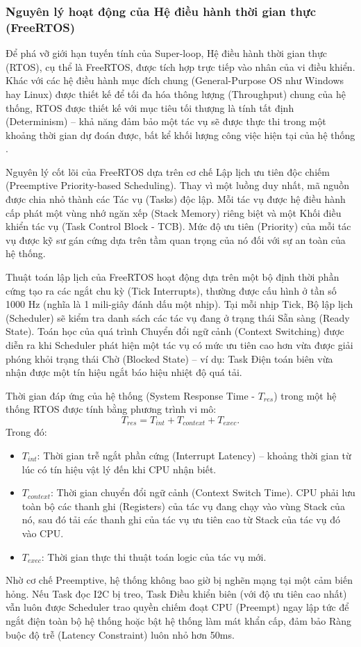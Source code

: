 \subsubsection{Nguyên lý hoạt động của Hệ điều hành thời gian thực (FreeRTOS)}
Để phá vỡ giới hạn tuyến tính của Super-loop, Hệ điều hành thời gian thực (RTOS), cụ thể là FreeRTOS, được tích hợp trực tiếp vào nhân của vi điều khiển. Khác với các hệ điều hành mục đích chung (General-Purpose OS như Windows hay Linux) được thiết kế để tối đa hóa thông lượng (Throughput) chung của hệ thống, RTOS được thiết kế với mục tiêu tối thượng là tính tất định (Determinism) – khả năng đảm bảo một tác vụ sẽ được thực thi trong một khoảng thời gian dự đoán được, bất kể khối lượng công việc hiện tại của hệ thống \cite{laplante2004real}.

Nguyên lý cốt lõi của FreeRTOS dựa trên cơ chế Lập lịch ưu tiên độc chiếm (Preemptive Priority-based Scheduling). Thay vì một luồng duy nhất, mã nguồn được chia nhỏ thành các Tác vụ (Tasks) độc lập. Mỗi tác vụ được hệ điều hành cấp phát một vùng nhớ ngăn xếp (Stack Memory) riêng biệt và một Khối điều khiển tác vụ (Task Control Block - TCB). Mức độ ưu tiên (Priority) của mỗi tác vụ được kỹ sư gán cứng dựa trên tầm quan trọng của nó đối với sự an toàn của hệ thống.

Thuật toán lập lịch của FreeRTOS hoạt động dựa trên một bộ định thời phần cứng tạo ra các ngắt chu kỳ (Tick Interrupts), thường được cấu hình ở tần số 1000 Hz (nghĩa là 1 mili-giây đánh dấu một nhịp). Tại mỗi nhịp Tick, Bộ lập lịch (Scheduler) sẽ kiểm tra danh sách các tác vụ đang ở trạng thái Sẵn sàng (Ready State). Toán học của quá trình Chuyển đổi ngữ cảnh (Context Switching) được diễn ra khi Scheduler phát hiện một tác vụ có mức ưu tiên cao hơn vừa được giải phóng khỏi trạng thái Chờ (Blocked State) – ví dụ: Task Điện toán biên vừa nhận được một tín hiệu ngắt báo hiệu nhiệt độ quá tải.

Thời gian đáp ứng của hệ thống (System Response Time - $T_{res}$) trong một hệ thống RTOS được tính bằng phương trình vi mô:
\begin{equation}
    {T_{res} = T_{int} + T_{context} + T_{exec}}.
\end{equation}
Trong đó:
\begin{itemize}
    \item $T_{int}$: Thời gian trễ ngắt phần cứng (Interrupt Latency) – khoảng thời gian từ lúc có tín hiệu vật lý đến khi CPU nhận biết.
    \item $T_{context}$: Thời gian chuyển đổi ngữ cảnh (Context Switch Time). CPU phải lưu toàn bộ các thanh ghi (Registers) của tác vụ đang chạy vào vùng Stack của nó, sau đó tải các thanh ghi của tác vụ ưu tiên cao từ Stack của tác vụ đó vào CPU.
    \item $T_{exec}$: Thời gian thực thi thuật toán logic của tác vụ mới.
\end{itemize}
Nhờ cơ chế Preemptive, hệ thống không bao giờ bị nghẽn mạng tại một cảm biến hỏng. Nếu Task đọc I2C bị treo, Task Điều khiển biên (với độ ưu tiên cao nhất) vẫn luôn được Scheduler trao quyền chiếm đoạt CPU (Preempt) ngay lập tức để ngắt điện toàn bộ hệ thống hoặc bật hệ thống làm mát khẩn cấp, đảm bảo Ràng buộc độ trễ (Latency Constraint) luôn nhỏ hơn 50ms.

